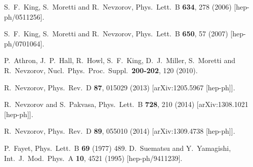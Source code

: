 \documentclass[final,3p,11pt,pdflatex]{elsarticle}
\begin{document}
\begin{thebibliography}{100}
  S.~F.~King, S.~Moretti and R.~Nevzorov,
  Phys.\ Lett.\ B {\bf 634}, 278 (2006)
  [hep-ph/0511256].

  S.~F.~King, S.~Moretti and R.~Nevzorov,
  Phys.\ Lett.\ B {\bf 650}, 57 (2007)
  [hep-ph/0701064].

  P.~Athron, J.~P.~Hall, R.~Howl, S.~F.~King, D.~J.~Miller, S.~Moretti and R.~Nevzorov,
  Nucl.\ Phys.\ Proc.\ Suppl.\  {\bf 200-202}, 120 (2010).

  R.~Nevzorov,
  Phys.\ Rev.\ D {\bf 87}, 015029 (2013)
  [arXiv:1205.5967 [hep-ph]].

  R.~Nevzorov and S.~Pakvasa,
  Phys.\ Lett.\ B {\bf 728}, 210 (2014)
  [arXiv:1308.1021 [hep-ph]].

  R.~Nevzorov,
  Phys.\ Rev.\ D {\bf 89}, 055010 (2014)
  [arXiv:1309.4738 [hep-ph]].


  P.~Fayet,
  Phys.\ Lett.\ B {\bf 69} (1977) 489.
  D.~Suematsu and Y.~Yamagishi,
  Int.\ J.\ Mod.\ Phys.\ A {\bf 10}, 4521 (1995)
  [hep-ph/9411239].


\end{thebibliography}
\end{document}
